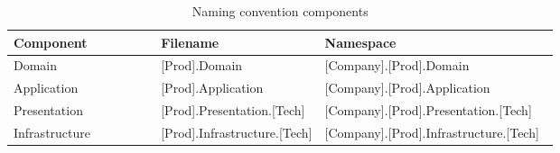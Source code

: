 \begin{table}[ht]
    \small
    \begin{tabular}{ l p{0.30\linewidth} p{0.43\linewidth} }
    \hline
    \textbf{Component} & \textbf{Filename} & \textbf{Namespace} \\ 
    \hline
    Domain & [Prod].Domain & [Company].[Prod].Domain \\
    Application & [Prod].Application & [Company].[Prod].Application \\
    Presentation & [Prod].Presentation.[Tech] & [Company].[Prod].Presentation.[Tech] \\
    Infrastructure & [Prod].Infrastructure.[Tech] & [Company].[Prod].Infrastructure.[Tech]
    \\ \hline
    \end{tabular}
\caption{Naming convention components}
\label{table:component_naming_convention}
\end{table}

